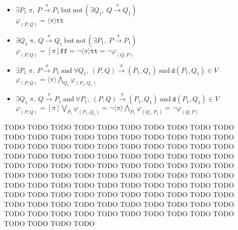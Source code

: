 \documentclass{llncs}
\begin{document}
\begin{itemize}
\item[]\quad
$\exists P_1\;\pi,~ P\xrightarrow{\pi}P_1 ~\text{but}~
 \text{not}\,(\exists Q_1,~ Q\xrightarrow{\pi}Q_1)$
    \\
    $\varphi_{(P,Q)} = \langle\pi\rangle\texttt{tt}$

\item[]\quad
$\exists Q_1\;\pi,~ Q\xrightarrow{\pi}Q_1 ~\text{but}~
 \text{not}\,(\exists P_1,~ P\xrightarrow{\pi}P_1)$
    \\
    $\varphi_{(P,Q)} = [\pi]\texttt{ff}
                     = \neg\langle\pi\rangle\texttt{tt}
                     = \neg\varphi_{(Q,P)}$

\item[]\quad
$ \exists P_1\;\pi,~ P \xrightarrow{\pi} P_1 ~\text{and}~
  \forall Q_1,~ (P,Q)\xrightarrow{\pi}(P_1,Q_1) ~\text{and}~
  \texttt{d}(P_1,Q_1)\in V $
    \\
    $\varphi_{(P,Q)} = \langle\pi\rangle\bigwedge_{Q_1}\varphi_{(P_1,Q_1)}$

\item[]\quad
$ \exists Q_1\;\pi,~ Q \xrightarrow{\pi} P_1 ~\text{and}~
  \forall P_1,~ (P,Q)\xrightarrow{\pi}(P_1,Q_1) ~\text{and}~
  \texttt{d}(P_1,Q_1)\in V $
    \\
    $ \varphi_{(P,Q)} = [\pi]\bigvee_{P_1}\varphi_{(P_1,Q_1)}
    = \neg\langle\pi\rangle\bigwedge_{P_1}\varphi_{(Q_1,P_1)}
    = \neg\varphi_{(Q,P)} 
    $

\end{itemize}


TODO TODO TODO TODO TODO TODO TODO TODO TODO TODO TODO TODO TODO
TODO TODO TODO TODO TODO TODO TODO TODO TODO TODO TODO TODO TODO
TODO TODO TODO TODO TODO TODO TODO TODO TODO TODO TODO TODO TODO
TODO TODO TODO TODO TODO TODO TODO TODO TODO TODO TODO TODO TODO
TODO TODO TODO TODO TODO TODO TODO TODO TODO TODO TODO TODO TODO
TODO TODO TODO TODO TODO TODO TODO TODO TODO TODO TODO TODO TODO
TODO TODO TODO TODO TODO TODO TODO TODO TODO TODO TODO TODO TODO
TODO TODO TODO TODO TODO TODO TODO TODO TODO TODO TODO TODO TODO
\end{document}
